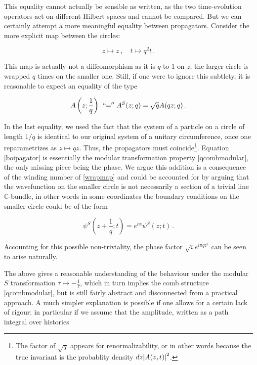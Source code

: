 \documentclass{article}
\begin{document}
This equality cannot actually be sensible as written, as the two time-evolution operators act on different Hilbert spaces and cannot be compared. But we can certainly attempt a more meaningful equality between propagators. Consider the more explicit map between the circles:

\begin{equation} \label{wrapmap}
    z \mapsto z\,, \quad t \mapsto q^2 t\,.
\end{equation}

This map is actually not a diffeomorphism as it is $q$-to-$1$ on $z$; the larger circle is wrapped $q$ times on the smaller one. Still, if one were to ignore this subtlety, it is reasonable to expect an equality of the type

\begin{equation} \label{boipagator}
    A\left(z;\frac{1}{q}\right) \; {\,``\!\!=''} \; A^S(z;q) = \sqrt{q} A(qz;q)\,.
\end{equation}

In the last equality, we used the fact that the system of a particle on a circle of length $1/q$ is identical to our original system of a unitary circumference, once one reparametrizes as $z \mapsto qz$. Thus, the propagators must coincide\footnote{The factor of $\sqrt{q}$ appears for renormalizability, or in other words because the true invariant is the probablity density $dz \abs{A(z,t)}^2$.}. Equation \eqref{boipagator} is essentially the modular transformation property \eqref{qcombmodular}, the only missing piece being the phase. We argue this addition is a consequence of the winding number of \eqref{wrapmap} and could be accounted for by arguing that the wavefunction on the smaller circle is not necessarily a section of a trivial line $\mathbb{C}$-bundle, in other words in some coordinates the boundary conditions on the smaller circle could be of the form

\begin{equation}
    \psi^S(z + \frac{1}{q}; t) = e^{i\alpha} \psi^S(z;t)\,.
\end{equation}

Accounting for this possible non-triviality, the phase factor $\sqrt{i} e^{i\pi q z^2}$ can be seen to arise naturally.

The above gives a reasonable understanding of the behaviour under the modular $S$ transformation $\tau \mapsto - \frac{1}{\tau}$, which in turn implies the comb structure \eqref{qcombmodular}, but is still fairly abstract and disconnected from a practical approach. A much simpler explanation is possible if one allows for a certain lack of rigour; in particular if we assume that the amplitude, written as a path integral over histories
\end{document}

